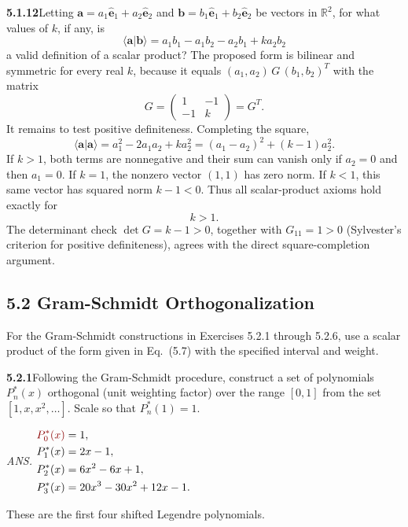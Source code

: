 \par\bigskip
\noindent\textbf{5.1.12}\quad Letting
$\mathbf{a}=a_{1}\hat{\mathbf{e}}_{1}+a_{2}\hat{\mathbf{e}}_{2}$ and
$\mathbf{b}=b_{1}\hat{\mathbf{e}}_{1}+b_{2}\hat{\mathbf{e}}_{2}$ be vectors in
$\mathbb{R}^{2}$, for what values of $k$, if any, is
\[
\langle\mathbf{a}|\mathbf{b}\rangle
=a_{1}b_{1}-a_{1}b_{2}-a_{2}b_{1}+ka_{2}b_{2}
\]
a valid definition of a scalar product?
\solution
The proposed form is bilinear and symmetric for every real $k$, because
it equals $(a_1,a_2)\,G\,(b_1,b_2)^T$ with the matrix
\[
G=\begin{pmatrix}1&-1\\-1&k\end{pmatrix}=G^T.
\]
It remains to test positive definiteness. Completing the square,
\[
\langle\mathbf a|\mathbf a\rangle
=a_1^2-2a_1a_2+ka_2^2=(a_1-a_2)^2+(k-1)a_2^2.
\]
If $k>1$, both terms are nonnegative and their sum can vanish only if
$a_2=0$ and then $a_1=0$. If $k=1$, the nonzero vector $(1,1)$ has
zero norm. If $k<1$, this same vector has squared norm $k-1<0$.
Thus all scalar-product axioms hold exactly for
\[
\boxed{k>1}.
\]
The determinant check $\det G=k-1>0$, together with $G_{11}=1>0$
(Sylvester's criterion for positive definiteness), agrees with the direct
square-completion argument.

\subsection*{5.2 Gram-Schmidt Orthogonalization}

For the Gram-Schmidt constructions in Exercises 5.2.1 through 5.2.6, use a
scalar product of the form given in Eq.~(5.7) with the specified interval and
weight.

\par\bigskip
\noindent\textbf{5.2.1}\quad Following the Gram-Schmidt procedure, construct a
set of polynomials $P_{n}^{*}(x)$ orthogonal (unit weighting factor) over the
range $[0,1]$ from the set $[1,x,x^{2},\ldots]$. Scale so that
$P_{n}^{*}(1)=1$.
\par\nobreak\hfill\emph{ANS.}\enspace
$\begin{aligned}
\erratum{P_{0}^{*}(x)}&=1,\\
P_{1}^{*}(x)&=2x-1,\\
P_{2}^{*}(x)&=6x^{2}-6x+1,\\
P_{3}^{*}(x)&=20x^{3}-30x^{2}+12x-1.
\end{aligned}$\par
These are the first four shifted Legendre polynomials.

